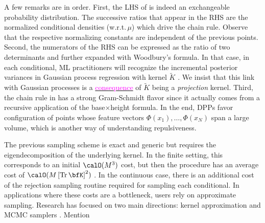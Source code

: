 \documentclass[twoside,11pt]{article}
\begin{document}
        A few remarks are in order.
        First, the LHS of  is indeed an exchangeable probability distribution.
        The successive ratios that appear in the RHS are the normalized conditional densities (w.r.t.\,$\mu$) which drive the chain rule.
        Observe that the respective normalizing constants are independent of the previous points.
        Second, the numerators of the RHS can be expressed as the ratio of two determinants and further expanded with Woodbury's formula.
        In that case, in each conditional, ML practitioners will recognize the incremental posterior variances in Gaussian process regression with kernel $\tilde K$ \citep[Equation 2.26]{RaWi06}.
        We insist that this link with Gaussian processes is a \href{https://dppy.readthedocs.io/en/latest/finite_dpps/exact_sampling.html#caution}{\textcolor{magenta}{consequence}} of $\tilde K$ being a \emph{projection} kernel.
        Third, the chain rule in  has a strong Gram-Schmidt flavor since it actually comes from a recursive application of the base$\times$height formula.
        In the end, DPPs favor configuration of points whose feature vectors $\Phi(x_1),\dots, \Phi(x_N)$ span a large volume, which is another way of understanding repulsiveness.

        The previous sampling scheme is exact and generic but requires the eigendecomposition of the underlying kernel.
        In the finite setting, this corresponds to an initial $\calO(M^3)$ cost, but then the procedure has an average cost of $\calO(M\lrb{\Tr \bfK}^2)$
        \citep{TrBaAm18}.
        In the continuous case, there is an additional cost of the rejection sampling routine required for sampling each conditional.
        In applications where these costs are a bottleneck, users rely on approximate sampling.
        Research has focused on two main directions: kernel approximation \citep{AKFT13} and MCMC samplers \citep{AnGhRe16, LiJeSr16c, GaBaVa17}.
        Mention \citep{Pou19,DeCaVa19}
\end{document}
